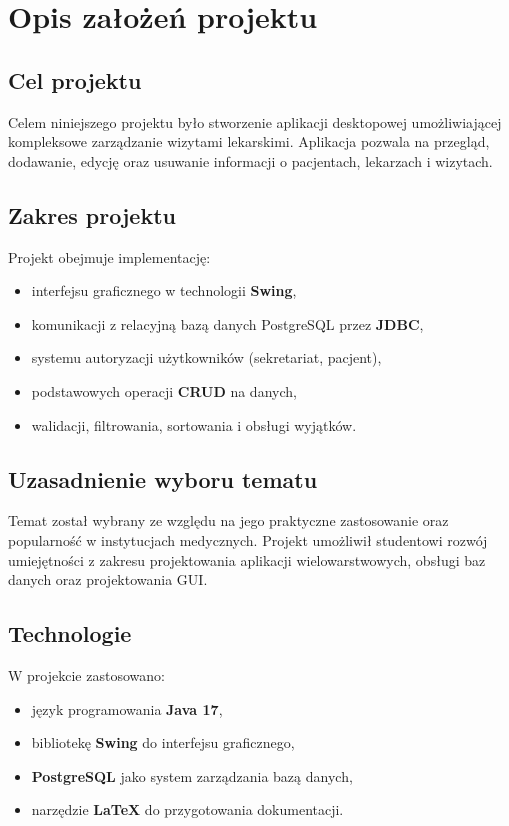 \chapter{Opis założeń projektu}

\section{Cel projektu}
Celem niniejszego projektu było stworzenie aplikacji desktopowej umożliwiającej kompleksowe zarządzanie wizytami lekarskimi. Aplikacja pozwala na przegląd, dodawanie, edycję oraz usuwanie informacji o pacjentach, lekarzach i wizytach.

\section{Zakres projektu}
Projekt obejmuje implementację:
\begin{itemize}
\item interfejsu graficznego w technologii \textbf{Swing},
\item komunikacji z relacyjną bazą danych PostgreSQL przez \textbf{JDBC},
\item systemu autoryzacji użytkowników (sekretariat, pacjent),
\item podstawowych operacji \textbf{CRUD} na danych,
\item walidacji, filtrowania, sortowania i obsługi wyjątków.
\end{itemize}

\section{Uzasadnienie wyboru tematu}
Temat został wybrany ze względu na jego praktyczne zastosowanie oraz popularność w instytucjach medycznych. Projekt umożliwił studentowi rozwój umiejętności z zakresu projektowania aplikacji wielowarstwowych, obsługi baz danych oraz projektowania GUI.

\section{Technologie}
W projekcie zastosowano:
\begin{itemize}
\item język programowania \textbf{Java 17},
\item bibliotekę \textbf{Swing} do interfejsu graficznego,
\item \textbf{PostgreSQL} jako system zarządzania bazą danych,
\item narzędzie \textbf{LaTeX} do przygotowania dokumentacji.
\end{itemize}

